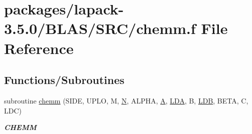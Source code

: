 \hypertarget{lapack-3_85_80_2BLAS_2SRC_2chemm_8f}{}\section{packages/lapack-\/3.5.0/\+B\+L\+A\+S/\+S\+R\+C/chemm.f File Reference}
\label{lapack-3_85_80_2BLAS_2SRC_2chemm_8f}
\subsection*{Functions/\+Subroutines}
\begin{DoxyCompactItemize}
\item 
subroutine \hyperlink{group__complex__blas__level3_gad2d1853a142397404eae974b6574ece3}{chemm} (S\+I\+D\+E, U\+P\+L\+O, M, \hyperlink{polmisc_8c_a0240ac851181b84ac374872dc5434ee4}{N}, A\+L\+P\+H\+A, \hyperlink{classA}{A}, \hyperlink{example__user_8c_ae946da542ce0db94dced19b2ecefd1aa}{L\+D\+A}, B, \hyperlink{example__user_8c_a50e90a7104df172b5a89a06c47fcca04}{L\+D\+B}, B\+E\+T\+A, C, L\+D\+C)
\begin{DoxyCompactList}\small\item\em {\bfseries C\+H\+E\+M\+M} \end{DoxyCompactList}\end{DoxyCompactItemize}
